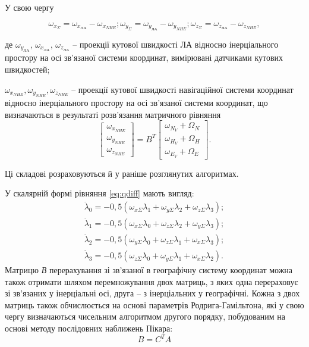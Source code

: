 \begin{ESKDexplanation}
 \item У свою чергу  

\[\omega_{x_{\Sigma }} =\omega_{x_{\text{ЛА}}} -\omega_{x_{NHE}} ;  \omega 
_{y_{\Sigma }} =\omega_{y_{\text{ЛА}}} -\omega_{y_{NHE}} ;  \omega_{z_{\Sigma 
}} =\omega_{z_{\text{ЛА}}} -\omega_{z_{NHE}} ,\] 

де  $\omega_{y_{\text{ЛА}}}$, $\omega_{x_{\text{ЛА}}}$, $\omega_{z_{\text{ЛА}}}$ --
проекції кутової швидкості ЛА відносно інерціального простору на осі 
зв'язаної системи координат, вимірювані датчиками кутових швидкостей;

 \item $\omega_{x_{NHE}} ,\omega_{y_{NHE}} ,\omega_{z_{NHE}} $ -- проекції кутової 
швидкості навігаційної системи координат відносно інерціального простору на осі зв'язаної 
системи координат, що визначаються в результаті розв'язання матричного рівняння 
\[\left[
\begin{array}{c} 
{\omega_{x_{NHE}}} \\ 
{\omega_{y_{NHE}}} \\ 
{\omega_{z_{NHE}}} 
\end{array}\right]=B^{T} 
\left[\begin{array}{c} 
{\omega_{N_{V}} +\Omega_{N}} \\ 
{\omega_{H_{V}} +\Omega_{H}} \\ 
{\omega_{E_{V}} +\Omega_{E}} 
\end{array}\right].\] 
\end{ESKDexplanation}
Ці складові розраховуються й у раніше розглянутих алгоритмах.


У скалярній формі рівняння \eqref{eq:qdiff} мають вигляд:
\[\begin{array}{l} 
{\dot{\lambda }_{0} =-0,5(\omega_{x\Sigma } \lambda_{1} +\omega_{y\Sigma } \lambda_{2} +\omega_{z\Sigma } \lambda_{3} );} \\ 
{\dot{\lambda }_{1} =-0,5(\omega_{x\Sigma } \lambda_{0} +\omega_{z\Sigma } \lambda_{2} +\omega_{y\Sigma } \lambda_{3} );} \\ 
{\dot{\lambda }_{2} =-0,5(\omega_{y\Sigma } \lambda_{0} +\omega_{z\Sigma } \lambda_{1} +\omega_{x\Sigma } \lambda_{3} );} \\ 
{\dot{\lambda }_{3} =-0,5(\omega_{z\Sigma } \lambda_{0} +\omega_{y\Sigma } \lambda_{1} +\omega_{x\Sigma } \lambda_{2} ).} 
\end{array}\] 
Матрицю \textit{В} перерахування зі зв'язаної в географічну систему координат можна 
також отримати шляхом перемножування двох матриць, з яких одна перераховує зі зв'язаних 
у інерціальні осі, друга -- з інерціальних у географічні. Кожна з двох матриць також 
обчислюється на основі параметрів Родрига-Гамільтона, які у свою чергу визначаються 
чисельним алгоритмом другого порядку, побудованим на основі методу послідовних наближень  
Пікара:
\[B=C^{T}A\]

